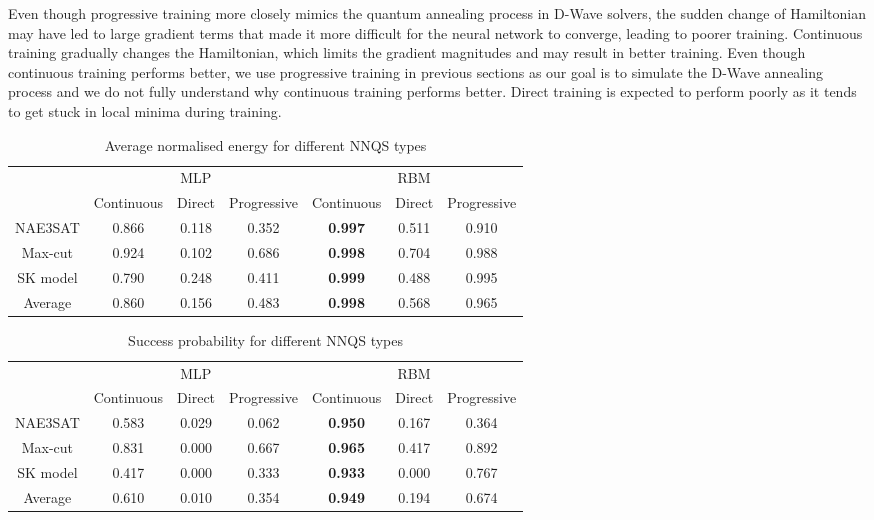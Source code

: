 Even though progressive training more closely mimics the quantum annealing process in D-Wave solvers, the sudden change of Hamiltonian may have led to large gradient terms that made it more difficult for the neural network to converge, leading to poorer training. Continuous training gradually changes the Hamiltonian, which limits the gradient magnitudes and may result in better training. Even though continuous training performs better, we use progressive training in previous sections as our goal is to simulate the D-Wave annealing process and we do not fully understand why continuous training performs better. Direct training is expected to perform poorly as it tends to get stuck in local minima during training. 

\begin{table}[!htb]
    \centering
    \caption{Average normalised energy for different NNQS types}
    \label{results:nnqsnormalizedenergy}
    \begin{tabular}{ccccccc} \toprule
        ~ & \multicolumn{3}{c}{MLP} & \multicolumn{3}{c}{RBM} \\
        \cmidrule{2-7} & Continuous & Direct & Progressive & Continuous & Direct & Progressive \\
        \midrule
        NAE3SAT & 0.866 & 0.118 & 0.352 & \textbf{0.997} & 0.511 & 0.910 \\
        Max-cut & 0.924 & 0.102 & 0.686 & \textbf{0.998} & 0.704 & 0.988 \\
        SK model & 0.790 & 0.248 & 0.411 & \textbf{0.999} & 0.488 & 0.995 \\ \midrule
        Average & 0.860 & 0.156 & 0.483 & \textbf{0.998} & 0.568 & 0.965 \\ \bottomrule
    \end{tabular}
\end{table}

\begin{table}[!htb]
    \centering
    \caption{Success probability for different NNQS types}
    \label{results:nnqssuccess}
    \begin{tabular}{ccccccc} \toprule
        ~ & \multicolumn{3}{c}{MLP} & \multicolumn{3}{c}{RBM} \\
        \cmidrule{2-7} & Continuous & Direct & Progressive & Continuous & Direct & Progressive \\
        \midrule
        NAE3SAT & 0.583 & 0.029 & 0.062 & \textbf{0.950} & 0.167 & 0.364 \\
        Max-cut & 0.831 & 0.000 & 0.667 & \textbf{0.965} & 0.417 & 0.892 \\
        SK model & 0.417 & 0.000 & 0.333 & \textbf{0.933} & 0.000 & 0.767 \\ \midrule
        Average & 0.610 & 0.010 & 0.354 & \textbf{0.949} & 0.194 & 0.674 \\ \bottomrule
    \end{tabular}
\end{table}